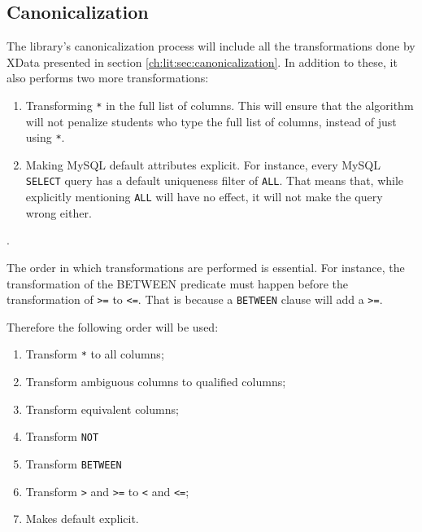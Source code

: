 \begin{tabularx}{\textwidth}{|c|Y|Y|}

\end{tabularx}

\subsection{Canonicalization} \label{ch:lit:sec:improved_canon}

The library's canonicalization process will include all the transformations done by XData presented in section \ref{ch:lit:sec:canonicalization}. In addition to these, it also performs two more transformations:
\begin{enumerate}
    \item Transforming \texttt{*} in the full list of columns. This will ensure that the algorithm will not penalize students who type the full list of columns, instead of just using  \texttt{*}.
    \item Making MySQL default attributes explicit. For instance, every MySQL \texttt{SELECT} query has a default uniqueness filter of \texttt{ALL}. That means that, while explicitly mentioning \texttt{ALL} will have no effect, it will not make the query wrong either.
\end{enumerate}.

The order in which transformations are performed is essential. For instance, the transformation of the BETWEEN predicate must happen before the transformation of \texttt{>=} to \texttt{<=}. That is because a \texttt{BETWEEN} clause will add a \texttt{>=}.

Therefore the following order will be used:

\begin{enumerate}
    \item Transform \texttt{*} to all columns;
    \item Transform ambiguous columns to qualified columns;
    \item Transform equivalent columns;
    \item Transform \texttt{NOT}
    \item Transform \texttt{BETWEEN}
    \item Transform \texttt{>} and \texttt{>=} to \texttt{<} and \texttt{<=};
    \item Makes default explicit.
\end{enumerate}

